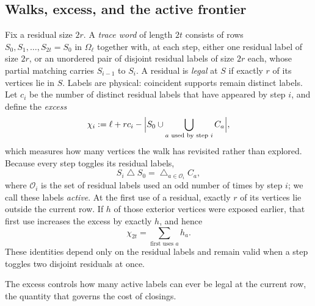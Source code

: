 \documentclass[11pt]{article}
\theoremstyle{definition}
\theoremstyle{remark}
\newcommand{\1}{\mathbf 1}
\newcommand{\cO}{\mathcal O}
\newcommand{\sd}{\mathbin{\triangle}}
\newcommand{\bigsd}{\mathop{\bigtriangleup}}
\numberwithin{equation}{section}
\begin{document}
\subsection{Walks, excess, and the active frontier}

Fix a residual size $2r$.  A \emph{trace word} of length $2t$ consists of
rows $S_0,S_1,\ldots,S_{2t}=S_0$ in $\Omega_\ell$ together with, at each
step, either one residual label of size $2r$, or an unordered pair of
disjoint residual labels of size $2r$ each, whose partial matching carries
$S_{i-1}$ to $S_i$.  A residual is \emph{legal} at $S$ if exactly $r$ of
its vertices lie in $S$.  Labels are physical: coincident supports remain
distinct labels.  Let $c_i$ be the number of distinct residual labels that
have appeared by step $i$, and define the \emph{excess}
\begin{equation}\label{eq:excess}
 \chi_i:=\ell+rc_i-
 \Bigl|S_0\cup\bigcup_{a\text{ used by step }i}C_a\Bigr|,
\end{equation}
which measures how many vertices the walk has revisited rather than
explored.  Because every step toggles its residual labels,
\begin{equation}\label{eq:parity-identity}
 S_i\sd S_0=\bigsd_{a\in\cO_i}C_a,
\end{equation}
where $\cO_i$ is the set of residual labels used an odd number of times by
step $i$; we call these labels \emph{active}.  At the first use of a
residual, exactly $r$ of its vertices lie outside the current row.  If
$h$ of those exterior vertices were exposed earlier, that first use
increases the excess by exactly $h$, and hence
\begin{equation}\label{eq:excess-sum}
 \chi_{2t}=\sum_{\text{first uses }a}h_a.
\end{equation}
These identities depend only on the residual labels and remain valid when a
step toggles two disjoint residuals at once.

The excess controls how many active labels can ever be legal at the
current row, the quantity that governs the cost of closings.
\end{document}
